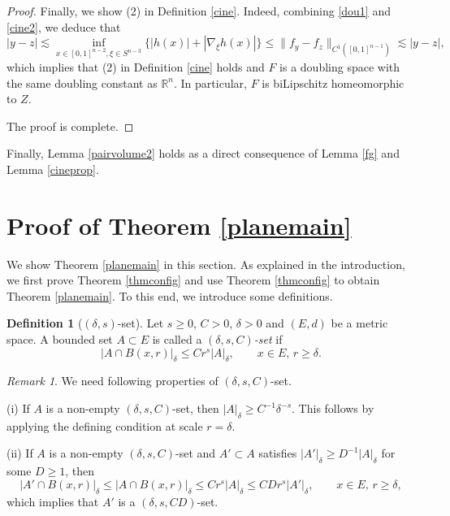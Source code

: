 \documentclass[11pt,a4paper,reqno]{amsart}
\newcommand{\1}{\mathbf{1}}
\numberwithin{equation}{section}
\theoremstyle{plain}
\theoremstyle{definition}
\newtheorem{definition}[equation]{Definition}
\theoremstyle{remark}
\newtheorem{remark}[equation]{Remark}
\begin{document}
\begin{proof}
\medskip

Finally, we show (2) in Definition \ref{cine}. Indeed, combining \eqref{dou1} and \eqref{cine2}, we deduce that
\begin{equation*}
 |y-z| \lesssim \inf_{x \in [0,1]^{n-2}, \xi \in S^{n-3}} \{ |h(x)| + |\nabla_\xi h(x)| \} \le  \|f_y-f_{z}\|_{C^1([0,1]^{n-1})} \lesssim |y-z|,
\end{equation*}
which implies that (2) in Definition \ref{cine} holds and
$F$ is a doubling space with the same doubling constant as $\mathbb{R}^{n}$. In particular, $F$ is biLipschitz homeomorphic to $Z$.


The proof is complete.
\end{proof}


Finally, Lemma \ref{pairvolume2} holds as a direct consequence of Lemma \ref{fg} and Lemma \ref{cineprop}.




\section{Proof of Theorem \ref{planemain}} \label{s3}
We show Theorem \ref{planemain} in this section. As explained in the introduction, we first prove Theorem \ref{thmconfig} and use Theorem \ref{thmconfig} to obtain Theorem \ref{planemain}.
To this end,
we introduce some definitions.


\begin{definition}[$(\delta,s)$-set] \label{dst}
Let $s \geq 0$, $C > 0$, $\delta> 0$ and $(E,d)$ be a metric space. A bounded set $A \subset E$ is called a \emph{$(\delta,s,C)$-set} if
\begin{displaymath}
|A \cap B(x,r)|_{\delta} \leq Cr^{s}|A|_{\delta}, \qquad x \in E, \, r \geq \delta. \end{displaymath}
  \end{definition}

\begin{remark} \label{deltaset}
  \rm We need following properties of $(\delta,s,C)$-set.

  (i) If $A$ is a non-empty $(\delta,s,C)$-set, then $|A|_{\delta} \geq C^{-1}\delta^{-s}$. This follows by applying the defining condition at scale $r = \delta$.

  (ii) If $A$ is a non-empty $(\delta,s,C)$-set and $A' \subset A$ satisfies $|A'|_{\delta} \ge D^{-1}|A|_{\delta}$ for some $D \ge 1$, then
  \begin{displaymath}
  |A' \cap B(x,r)|_{\delta} \leq |A \cap B(x,r)|_{\delta} \le Cr^{s}|A|_{\delta} \le CDr^{s}|A'|_{\delta}, \qquad x \in E, \, r \geq \delta, \end{displaymath}
  which implies that $A'$ is a $(\delta,s,CD)$-set.
\end{remark}
\end{document}
